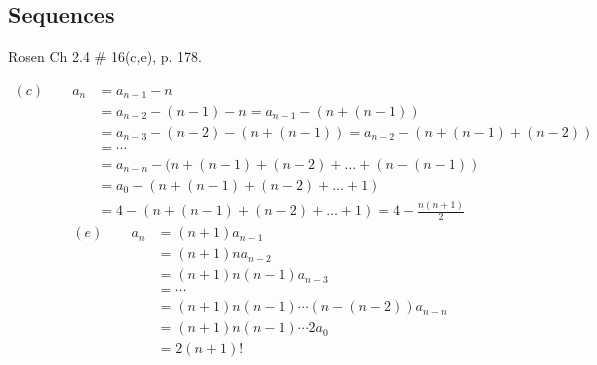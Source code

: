 \begin{questions}



\section*{Sequences} 

 Rosen Ch 2.4 \# 16(c,e), p. 178.
    \ifprintanswers
        \vspace{-10pt}
   \fi
\begin{solution}
        \vspace{-0.1in} 
        \begin{align*}
            (c) \quad \quad a_n &= a_{n-1} - n \\
            &= a_{n-2} -(n-1) - n = a_{n-1} - (n + (n-1)) \\
            &= a_{n-3} -(n-2) - (n + (n-1)) = a_{n-2} - (n + (n-1) + (n-2)) \\
            &= \cdots \\
            &= a_{n-n} -(n + (n-1) + (n-2) + \ldots + (n- (n-1)) \\
            &= a_0 - (n + (n-1) + (n-2) + \ldots + 1) \\
            &= 4 - (n + (n-1) + (n-2) + \ldots + 1) = 4 -\frac{n(n+1)}{2}
        \end{align*}
        \vspace{-0.1in}
        \begin{align*}
            (e) \quad \quad a_n &= (n+1)a_{n-1} \\
              &= (n+1)na_{n-2} \\
              &= (n+1)n(n-1)a_{n-3} \\
              &= \cdots \\
              &= (n+1)n(n-1)\cdots(n-(n-2))a_{n-n} \\
              &= (n+1)n(n-1)\cdots2a_{0} \\
              &= 2(n+1)!
        \end{align*}
\end{solution}



\end{questions}
